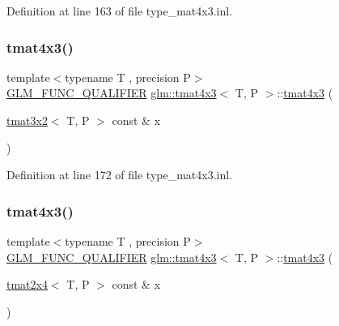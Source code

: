 Definition at line 163 of file type\+\_\+mat4x3.\+inl.

\mbox{\label{structglm_1_1tmat4x3_a125210f891f2b11559d36ea49cbb66ba}} 
\subsubsection{\texorpdfstring{tmat4x3()}{tmat4x3()}\hspace{0.1cm}{\footnotesize\ttfamily [15/22]}}
{\footnotesize\ttfamily template$<$typename T , precision P$>$ \\
\mbox{\hyperlink{setup_8hpp_a33fdea6f91c5f834105f7415e2a64407}{G\+L\+M\+\_\+\+F\+U\+N\+C\+\_\+\+Q\+U\+A\+L\+I\+F\+I\+ER}} \mbox{\hyperlink{structglm_1_1tmat4x3}{glm\+::tmat4x3}}$<$ T, P $>$\+::\mbox{\hyperlink{structglm_1_1tmat4x3}{tmat4x3}} (\begin{DoxyParamCaption}\item[{\mbox{\hyperlink{structglm_1_1tmat3x2}{tmat3x2}}$<$ T, P $>$ const \&}]{x }\end{DoxyParamCaption})}



Definition at line 172 of file type\+\_\+mat4x3.\+inl.

\mbox{\label{structglm_1_1tmat4x3_a7c76da17513ed772c8b7ebf778fd881f}} 
\subsubsection{\texorpdfstring{tmat4x3()}{tmat4x3()}\hspace{0.1cm}{\footnotesize\ttfamily [16/22]}}
{\footnotesize\ttfamily template$<$typename T , precision P$>$ \\
\mbox{\hyperlink{setup_8hpp_a33fdea6f91c5f834105f7415e2a64407}{G\+L\+M\+\_\+\+F\+U\+N\+C\+\_\+\+Q\+U\+A\+L\+I\+F\+I\+ER}} \mbox{\hyperlink{structglm_1_1tmat4x3}{glm\+::tmat4x3}}$<$ T, P $>$\+::\mbox{\hyperlink{structglm_1_1tmat4x3}{tmat4x3}} (\begin{DoxyParamCaption}\item[{\mbox{\hyperlink{structglm_1_1tmat2x4}{tmat2x4}}$<$ T, P $>$ const \&}]{x }\end{DoxyParamCaption})}



